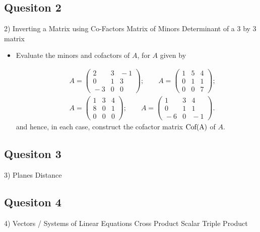 \documentclass[12pt,a4paper]{article}
\begin{document}
\subsection*{Quesiton 2}

2) Inverting a Matrix using Co-Factors
	Matrix of Minors
	Determinant of a 3 by 3 matrix

\begin{itemize}	
\item Evaluate the  minors and cofactors of $A$, for $A$ given by

\begin{eqnarray*}
& &\!\!\!\!\!\!\!\!A=\left( \begin{array}{ccc}
2 & 3 & \!\!\!\!-1\\
0 & 1 & 3\\
\!\!\!\!-3 & 0 & 0\end{array}\right);\qquad A=\left( \begin{array}{ccc}
1 & 5 & 4\\
0 & 1 & 1\\
0 & 0 & 7
\end{array} \right);\\
& &\!\!\!\!\!\!\!\!A=\left( \begin{array}{ccc}
1 & 3 & 4\\
8 & 0 & 1\\
0 & 0 & 0\end{array}\right);\qquad A=\left( \begin{array}{ccc}
1 & 3 & 4\\
0 & 1 & 1\\
\!\!\!\!-6 & 0 & \!\!\!\!-1
\end{array} \right).
\end{eqnarray*}
and hence, in each case, construct the cofactor matrix $\textnormal{Cof(A)}$ of $A$.
\end{itemize}

\subsection*{Quesiton 3}

3) Planes
	Distance
\subsection*{Quesiton 4}
4) Vectors / Systems of Linear Equations
	Cross Product
	Scalar Triple Product
\end{document}
